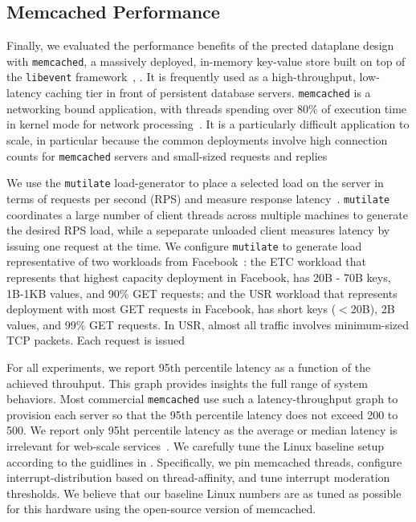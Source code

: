 
\subsection{Memcached Performance}
\label{sec:eval:memcached}




Finally, we evaluated the performance benefits of the \ix prected
dataplane design with \texttt{memcached}, a massively deployed,
in-memory key-value store built on top of the \texttt{libevent}
framework~\cite{url:memcached}, . It is frequently used as a
high-throughput, low-latency caching tier in front of persistent
database servers. \texttt{memcached} is a networking bound
application, with threads spending over 80\% of execution time in
kernel mode for network processing~\cite{Leverich:RHSU:2014}. It is a
particularly difficult application to scale, in particular because the
common deployments involve high connection counts for
\texttt{memcached} servers and small-sized requests and
replies~\cite{nishtala2013scaling,Atikoglu:2012:WAL}

We use the \texttt{mutilate} load-generator to place a selected load
on the server in terms of requests per second (RPS) and measure
response latency~\cite{url:mutilate}. \texttt{mutilate} coordinates a
large number of client threads across multiple machines to generate
the desired RPS load, while a sepeparate unloaded client measures
latency by issuing one request at the time.  We configure
\texttt{mutilate} to generate load representative of two workloads
from Facebook~\cite{Atikoglu:2012:WAL}: the ETC workload that
represents that highest capacity deployment in Facebook, has 20B - 70B
keys, 1B-1KB values, and 90\% GET requests; and the USR workload that
represents deployment with most GET requests in Facebook, has short
keys ($<$20B), 2B values, and 99\% GET requests. In USR, almost all
traffic involves minimum-sized TCP packets. Each request is issued 

For all experiments, we report 95th percentile latency as a function
of the achieved throuhput. This graph provides insights the full range
of system behaviors. Most commercial \texttt{memcached} use such a
latency-throughput graph to provision each server so that the 95th
percentile latency does not exceed 200 to 500\microsecond. We report
only 95ht percentile latency as the average or median latency is
irrelevant for web-scale services~\cite{DBLP:journals/cacm/DeanB13}.
We carefully tune the Linux baseline setup according to the guidlines
in \cite{Leverich:RHSU:2014}. Specifically, we pin memcached threads,
configure interrupt-distribution based on thread-affinity, and tune
interrupt moderation thresholds. We believe that our baseline Linux
numbers are as tuned as possible for this hardware using the
open-source version of memcached. 

